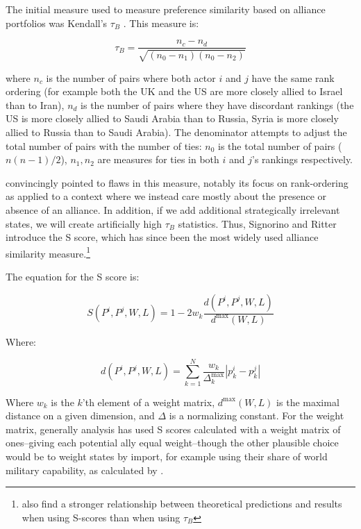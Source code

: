  The initial measure used to measure preference similarity based on alliance portfolios was Kendall's $\tau_{B}$ \citet{buenodemesquita:lalman:2008}. This measure is:
 
 \begin{equation}
	 \tau_{B} = \frac{n_{c} - n_{d}}{\sqrt{(n_{0} - n_{1})(n_{0} - n_{2})}}
 \end{equation}
 
 where $n_{c}$ is the number of pairs where both actor $i$ and $j$ have the same rank ordering (for example both the UK and the US are more closely allied to Israel than to Iran), $n_{d}$ is the number of pairs where they have discordant rankings (the US is more closely allied to Saudi Arabia than to Russia, Syria is more closely allied to Russia than to Saudi Arabia). The denominator attempts to adjust the total number of pairs with the number of ties: $n_{0}$ is the total number of pairs ($n(n-1)/2$), $n_{1}, n_{2}$ are measures for ties in both $i$ and $j$'s rankings respectively.
 
\citet{signorino:ritter:1999} convincingly pointed to flaws in this measure, notably its focus on rank-ordering as applied to a context where we instead care mostly about the presence or absence of an alliance. In addition, if we add additional strategically irrelevant states, we will create artificially high $\tau_{B}$ statistics. Thus, Signorino and Ritter introduce the S score, which has since been the most widely used alliance similarity measure.\footnote{\citep{bennett:rupert:2003} also find a stronger relationship between theoretical predictions and results when using S-scores than when using $\tau_{B}$}

The equation for the S score is:

\begin{equation}
	S(P^i, P^j, W, L) = 1 - 2w_k \frac{d(P^i, P^j, W, L)}{d^{\text{max}}(W,L)}
\end{equation}

Where:

\begin{equation}
	d(P^i, P^j, W, L) = \sum_{k = 1}^N \frac{w_k}{\Delta^\text{max}_{k}} |p^i_k - p^j_k|
\end{equation}

Where $w_k$ is the $k$'th element of a weight matrix, $d^\text{max}(W,L)$ is the maximal distance on a given dimension, and $\Delta$ is a normalizing constant. For the weight matrix, generally analysis has used S scores calculated with a weight matrix of ones--giving each potential ally equal weight--though the other plausible choice would be to weight states by import, for example using their share of world military capability, as calculated by \citet{singer:small:1995}.


